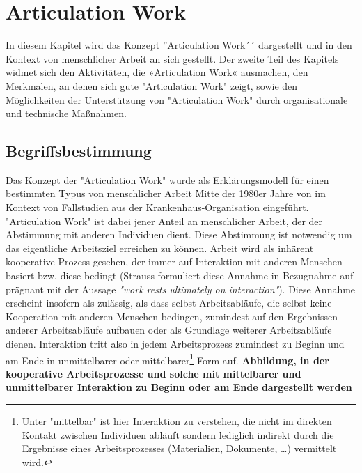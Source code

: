 \chapter{Articulation Work} %
\label{cha:articulation_work}

In diesem Kapitel wird das Konzept ''Articulation Work´´ dargestellt und in den Kontext von menschlicher Arbeit an sich gestellt. Der zweite Teil des Kapitels widmet sich den Aktivitäten, die »Articulation Work« ausmachen, den Merkmalen, an denen sich gute "Articulation Work" zeigt, sowie den Möglichkeiten der Unterstützung von "Articulation Work" durch organisationale und technische Maßnahmen.

\section{Begriffsbestimmung} %
\label{sec:begriffsbestimmung}

Das Konzept der "Articulation Work" wurde als Erklärungsmodell für einen bestimmten Typus von menschlicher Arbeit Mitte der 1980er Jahre von  \citet{Strauss85} im Kontext von Fallstudien aus der Krankenhaus-Organisation eingeführt. "Articulation Work" ist dabei jener Anteil an menschlicher Arbeit, der der Abstimmung mit anderen Individuen dient. Diese Abstimmung ist notwendig um das eigentliche Arbeitsziel erreichen zu können. Arbeit wird als inhärent kooperative Prozess gesehen, der immer auf Interaktion mit anderen Menschen basiert bzw. diese bedingt (Strauss formuliert diese Annahme in Bezugnahme auf \citet{Hughes71} prägnant mit der Aussage \emph{"work rests ultimately on interaction"}). Diese Annahme erscheint insofern als zulässig, als dass selbst Arbeitsabläufe, die selbst keine Kooperation mit anderen Menschen bedingen, zumindest auf den Ergebnissen anderer Arbeitsabläufe aufbauen oder als Grundlage weiterer Arbeitsabläufe dienen. Interaktion tritt also in jedem Arbeitsprozess zumindest zu Beginn und am Ende in unmittelbarer oder mittelbarer\footnote{Unter "mittelbar" ist hier Interaktion zu verstehen, die nicht im direkten Kontakt zwischen Individuen abläuft sondern  lediglich indirekt durch die Ergebnisse eines Arbeitsprozesses (Materialien, Dokumente, \ldots) vermittelt wird.} Form auf. \textbf{Abbildung, in der kooperative Arbeitsprozesse und solche mit mittelbarer und unmittelbarer Interaktion zu Beginn oder am Ende dargestellt werden}

